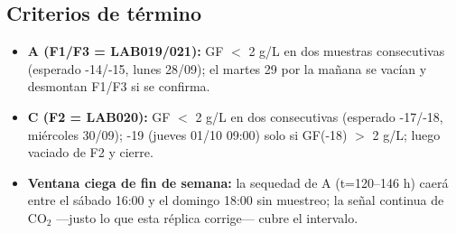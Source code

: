 \documentclass[10pt,landscape]{article}
\begin{document}
\subsection*{Criterios de término}
\begin{itemize}\setlength{\itemsep}{1pt}
\item \textbf{A (F1/F3 = LAB019/021):} GF $<$ 2 g/L en dos muestras consecutivas (esperado -14/-15, lunes 28/09); el martes 29 por la mañana se vacían y desmontan F1/F3 si se confirma.
\item \textbf{C (F2 = LAB020):} GF $<$ 2 g/L en dos consecutivas (esperado -17/-18, miércoles 30/09); -19 (jueves 01/10 09:00) solo si GF(-18) $>$ 2 g/L; luego vaciado de F2 y cierre.
\item \textbf{Ventana ciega de fin de semana:} la sequedad de A (t=120--146 h) caerá entre el sábado 16:00 y el domingo 18:00 sin muestreo; la señal continua de CO$_2$ ---justo lo que esta réplica corrige--- cubre el intervalo.
\end{itemize}
\end{document}
